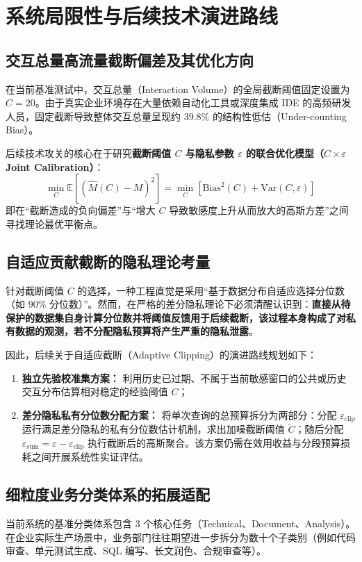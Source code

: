 \section{系统局限性与后续技术演进路线}
\label{sec:limitations}

\subsection{交互总量高流量截断偏差及其优化方向}
在当前基准测试中，交互总量（Interaction Volume）的全局截断阈值固定设置为 $C=20$。由于真实企业环境存在大量依赖自动化工具或深度集成 IDE 的高频研发人员，固定截断导致整体交互总量呈现约 $39.8\%$ 的结构性低估（Under-counting Bias）。

后续技术攻关的核心在于研究\textbf{截断阈值 $C$ 与隐私参数 $\varepsilon$ 的联合优化模型（$C \times \varepsilon$ Joint Calibration）}：
\begin{equation}
  \min_{C} \mathbb{E}\left[ \left( \hat{M}(C) - M \right)^2 \right] = \min_{C} \left[ \text{Bias}^2(C) + \text{Var}(C, \varepsilon) \right]
\end{equation}
即在“截断造成的负向偏差”与“增大 $C$ 导致敏感度上升从而放大的高斯方差”之间寻找理论最优平衡点。

\subsection{自适应贡献截断的隐私理论考量}
针对截断阈值 $C$ 的选择，一种工程直觉是采用“基于数据分布自适应选择分位数（如 90\% 分位数）”。然而，在严格的差分隐私理论下必须清醒认识到：\textbf{直接从待保护的数据集自身计算分位数并将阈值反馈用于后续截断，该过程本身构成了对私有数据的观测，若不分配隐私预算将产生严重的隐私泄露}。

因此，后续关于自适应截断（Adaptive Clipping）的演进路线规划如下：
\begin{enumerate}[label=(\alph*), leftmargin=2.5em]
  \item \textbf{独立先验校准集方案：} 利用历史已过期、不属于当前敏感窗口的公共或历史交互分布估算相对稳定的经验阈值 $C$；
  \item \textbf{差分隐私私有分位数分配方案：} 将单次查询的总预算拆分为两部分：分配 $\varepsilon_{\text{clip}}$ 运行满足差分隐私的私有分位数估计机制，求出加噪截断阈值 $\tilde{C}$；随后分配 $\varepsilon_{\text{sum}} = \varepsilon - \varepsilon_{\text{clip}}$ 执行截断后的高斯聚合。该方案仍需在效用收益与分段预算损耗之间开展系统性实证评估。
\end{enumerate}

\subsection{细粒度业务分类体系的拓展适配}
当前系统的基准分类体系包含 3 个核心任务（Technical、Document、Analysis）。在企业实际生产场景中，业务部门往往期望进一步拆分为数十个子类别（例如代码审查、单元测试生成、SQL 编写、长文润色、合规审查等）。

